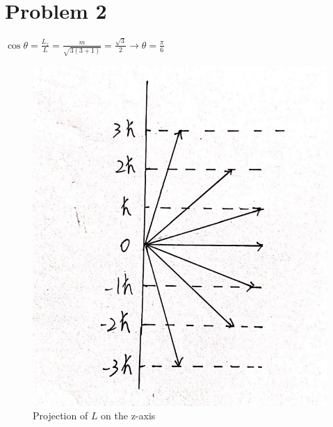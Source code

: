 \documentclass[a4paper]{article}
\begin{document}
\section{Problem 2}
\noindent $\cos\theta=\frac{L_z}{L}=\frac{m}{\sqrt{3(3+1)}}=\frac{\sqrt{3}}{2}\rightarrow\theta=\frac{\pi}{6}$
\begin{figure}[H]
    \centering
    \includegraphics[scale=0.5]{P1.png}
    \caption{Projection of $L$ on the z-axis}
\end{figure}
\end{document}
